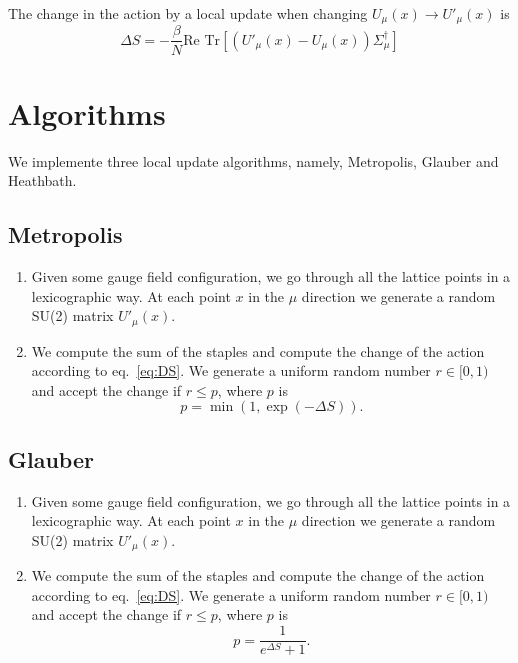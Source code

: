 \documentclass[12pt,a4paper]{article}
\begin{document}
The change in the action  by a local update when changing $U_{\mu}(x) \to U'_{\mu}(x)$ is
\begin{equation}
	\label{eq:DS}
	\Delta S = -\frac{\beta}{N} \text{Re } \text{Tr} \left[ \left( U'_{\mu}(x) - U_{\mu}(x) \right)\Sigma_{\mu}^{\dagger}\right]
\end{equation}

\section{Algorithms}

We implemente three local update algorithms, namely, Metropolis, Glauber and Heathbath.

\subsection{Metropolis}
\begin{enumerate}
	\item Given some gauge field configuration, we go through all the lattice points in a lexicographic way. At each point $x$ in the $\mu$ direction we generate a random SU(2) matrix $U'_{\mu}(x)$.
	
	\item We compute the sum of the staples and compute the change of the action according to eq.\ \eqref{eq:DS}. We generate a uniform random number $r\in [0,1)$ and accept the change if $r \leq p$, where $p$ is
	\begin{equation}
		p = \min (1, \exp(-\Delta S)).
\end{equation}	 
\end{enumerate}

\subsection{Glauber}
\begin{enumerate}
	\item Given some gauge field configuration, we go through all the lattice points in a lexicographic way. At each point $x$ in the $\mu$ direction we generate a random SU(2) matrix $U'_{\mu}(x)$.
	
	\item We compute the sum of the staples and compute the change of the action according to eq.\ \eqref{eq:DS}. We generate a uniform random number $r\in [0,1)$ and accept the change if $r \leq p$, where $p$ is
	\begin{equation}
		p = \frac{1}{e^{\Delta S} + 1}.
\end{equation}	 
\end{enumerate}
\end{document}
